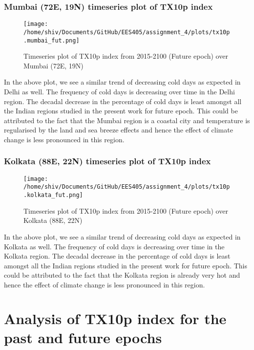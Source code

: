\documentclass[a4paper, 12pt, twoside]{report}
\begin{document}
\newpage

\subsection{Mumbai (72E, 19N) timeseries plot of TX10p index}

\begin{figure}[h]
    \centering
    \texttt{[image: /home/shiv/Documents/GitHub/EES405/assignment\_4/plots/tx10p.mumbai\_fut.png]}
    \caption{\centering Timeseries plot of TX10p index from 2015-2100 (Future epoch) over Mumbai (72E, 19N)}
    \label{fig:TX10p_timeseries_mumbai_fut}
\end{figure}

In the above plot, we see a similar trend of decreasing cold days as expected in Delhi as well. The frequency of cold days is decreasing over time in the Delhi region. The decadal decrease in the percentage of cold days is least amongst all the Indian regions studied in the present work for future epoch. This could be attributed to the fact that the Mumbai region is a coastal city and temperature is regularised by the land and sea breeze effects and hence the effect of climate change is less pronounced in this region.

\newpage

\subsection{Kolkata (88E, 22N) timeseries plot of TX10p index}

\begin{figure}[h]
    \centering
    \texttt{[image: /home/shiv/Documents/GitHub/EES405/assignment\_4/plots/tx10p.kolkata\_fut.png]}
    \caption{\centering Timeseries plot of TX10p index from 2015-2100 (Future epoch) over Kolkata (88E, 22N)}
    \label{fig:TX10p_timeseries_kolkata_fut}
\end{figure}

In the above plot, we see a similar trend of decreasing cold days as expected in Kolkata as well. The frequency of cold days is decreasing over time in the Kolkata region. The decadal decrease in the percentage of cold days is least amongst all the Indian regions studied in the present work for future epoch. This could be attributed to the fact that the Kolkata region is already very hot and hence the effect of climate change is less pronounced in this region.

\chapter{Analysis of TX10p index for the past and future epochs}
\end{document}
